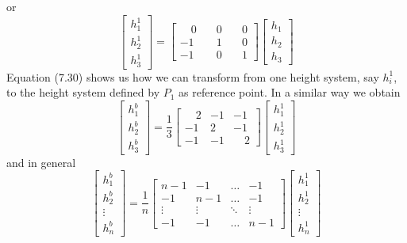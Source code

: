 or
\begin{equation}
\begin{bmatrix}
h_{1}^{1}\\
h_{2}^{1}\\
h_{3}^{1}
\end{bmatrix}
=\begin{bmatrix}
\quad0 & \quad0 & \quad0\\
-1 & \quad1 & \quad0\\
-1 & \quad0 & \quad1
\end{bmatrix}
\begin{bmatrix}
h_{1}\\
h_{2}\\
h_{3}
\end{bmatrix}
\end{equation}
Equation (7.30) shows us how we can transform from one height system, say $h_{i}^{1}$, to the
height system defined by $P_1$ as reference point. In a similar way we obtain
\begin{equation*}
\begin{bmatrix}
h_{1}^{b}\\
h_{2}^{b}\\
h_{3}^{b}
\end{bmatrix}
=\frac{1}{3}
\begin{bmatrix}
\quad2 & -1 & -1\\
-1 & 2 & -1\\
-1 & -1 & \quad2
\end{bmatrix}
\begin{bmatrix}
h_{1}^{1}\\
h_{2}^{1}\\
h_{3}^{1}
\end{bmatrix}
\end{equation*}
and in general
\begin{equation}
\begin{bmatrix}
h_{1}^{b}\\
h_{2}^{b}\\
\vdots\\
h_{n}^{b}
\end{bmatrix}
=\frac{1}{n}
\begin{bmatrix}
n - 1 & -1 & \ldots&-1\\
-1 &  n - 1& \ldots&-1\\
\vdots&\vdots&\ddots&\vdots\\
-1 & -1 &\ldots&   n - 1
\end{bmatrix}
\begin{bmatrix}
h_{1}^{1}\\
h_{2}^{1}\\
\vdots\\
h_{n}^{1}
\end{bmatrix}
\end{equation}
